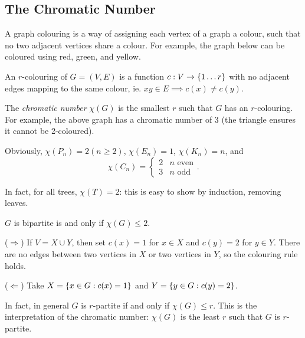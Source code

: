 \documentclass{article}
\begin{document}
\subsection{The Chromatic Number}

A graph colouring is a way of assigning each vertex of a graph a colour, such that no two adjacent vertices share a colour. For example, the graph below can be coloured using red, green, and yellow.


\begin{definition}
    \label{r-colouring-definition}
    An $r$-colouring of $G = (V, E)$ is a function $c: V \to \left\lbrace 1 \dots r \right\rbrace$ with no adjacent edges mapping to the same colour, ie. $xy \in E \implies c(x) \neq c(y)$.
    
    The \textit{chromatic number} $\chi(G)$ is the smallest $r$ such that $G$ has an $r$-colouring. For example, the above graph has a chromatic number of 3 (the triangle ensures it cannot be 2-coloured).
\end{definition}

Obviously, $\chi(P_n) = 2 (n \geq 2)$, $\chi(E_n) = 1$, $\chi(K_n) = n$, and
\[
\chi(C_n) = \begin{cases}
	2 & n \text{ even} \\
	3 & n \text{ odd}
\end{cases}.
\]
\begin{note}
	In fact, for all trees, $\chi(T) = 2$: this is easy to show by induction, removing leaves.
\end{note}

\begin{proposition}
    $G$ is bipartite is and only if $\chi(G) \leq 2$.
\end{proposition}

\begin{prf}
    ($\Rightarrow$) If $V = X \cup Y$, then set $c(x) = 1$ for $x \in X$ and $c(y) = 2$ for $y \in Y$. There are no edges between two vertices in $X$ or two vertices in $Y$, so the colouring rule holds.
    
    ($\Leftarrow$) Take $X = \left\lbrace x \in G: c(x) = 1 \right\rbrace$ and $Y = \left\lbrace y \in G: c(y) = 2 \right\rbrace$.
\end{prf}

\begin{note}
	In fact, in general $G$ is $r$-partite if and only if $\chi(G) \leq r$. This is the interpretation of the chromatic number: $\chi(G)$ is the least $r$ such that $G$ is $r$-partite. 
\end{note}
\end{document}
